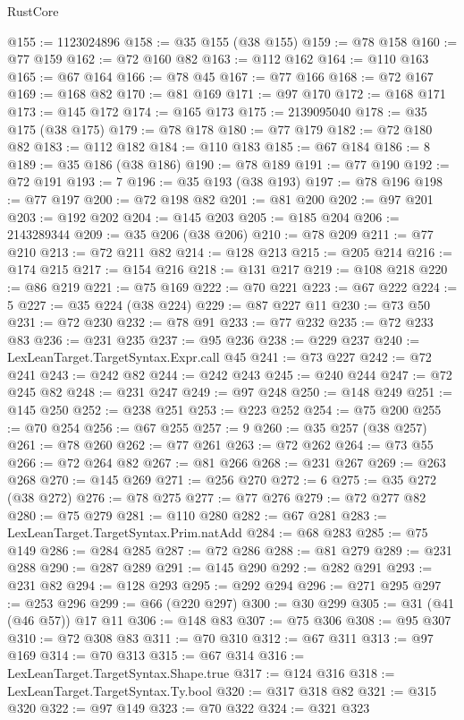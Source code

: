 \begin{lexlean}{RustCore}
\begin{coremodule}
@155 := 1123024896
@158 := @35 @155 (@38 @155)
@159 := @78 @158
@160 := @77 @159
@162 := @72 @160 @82
@163 := @112 @162
@164 := @110 @163
@165 := @67 @164
@166 := @78 @45
@167 := @77 @166
@168 := @72 @167
@169 := @168 @82
@170 := @81 @169
@171 := @97 @170
@172 := @168 @171
@173 := @145 @172
@174 := @165 @173
@175 := 2139095040
@178 := @35 @175 (@38 @175)
@179 := @78 @178
@180 := @77 @179
@182 := @72 @180 @82
@183 := @112 @182
@184 := @110 @183
@185 := @67 @184
@186 := 8
@189 := @35 @186 (@38 @186)
@190 := @78 @189
@191 := @77 @190
@192 := @72 @191
@193 := 7
@196 := @35 @193 (@38 @193)
@197 := @78 @196
@198 := @77 @197
@200 := @72 @198 @82
@201 := @81 @200
@202 := @97 @201
@203 := @192 @202
@204 := @145 @203
@205 := @185 @204
@206 := 2143289344
@209 := @35 @206 (@38 @206)
@210 := @78 @209
@211 := @77 @210
@213 := @72 @211 @82
@214 := @128 @213
@215 := @205 @214
@216 := @174 @215
@217 := @154 @216
@218 := @131 @217
@219 := @108 @218
@220 := @86 @219
@221 := @75 @169
@222 := @70 @221
@223 := @67 @222
@224 := 5
@227 := @35 @224 (@38 @224)
@229 := @87 @227 @11
@230 := @73 @50
@231 := @72 @230
@232 := @78 @91
@233 := @77 @232
@235 := @72 @233 @83
@236 := @231 @235
@237 := @95 @236
@238 := @229 @237
@240 := LexLeanTarget.TargetSyntax.Expr.call @45
@241 := @73 @227
@242 := @72 @241
@243 := @242 @82
@244 := @242 @243
@245 := @240 @244
@247 := @72 @245 @82
@248 := @231 @247
@249 := @97 @248
@250 := @148 @249
@251 := @145 @250
@252 := @238 @251
@253 := @223 @252
@254 := @75 @200
@255 := @70 @254
@256 := @67 @255
@257 := 9
@260 := @35 @257 (@38 @257)
@261 := @78 @260
@262 := @77 @261
@263 := @72 @262
@264 := @73 @55
@266 := @72 @264 @82
@267 := @81 @266
@268 := @231 @267
@269 := @263 @268
@270 := @145 @269
@271 := @256 @270
@272 := 6
@275 := @35 @272 (@38 @272)
@276 := @78 @275
@277 := @77 @276
@279 := @72 @277 @82
@280 := @75 @279
@281 := @110 @280
@282 := @67 @281
@283 := LexLeanTarget.TargetSyntax.Prim.natAdd
@284 := @68 @283
@285 := @75 @149
@286 := @284 @285
@287 := @72 @286
@288 := @81 @279
@289 := @231 @288
@290 := @287 @289
@291 := @145 @290
@292 := @282 @291
@293 := @231 @82
@294 := @128 @293
@295 := @292 @294
@296 := @271 @295
@297 := @253 @296
@299 := @66 (@220 @297)
@300 := @30 @299
@305 := @31 (@41 (@46 @57)) @17 @11
@306 := @148 @83
@307 := @75 @306
@308 := @95 @307
@310 := @72 @308 @83
@311 := @70 @310
@312 := @67 @311
@313 := @97 @169
@314 := @70 @313
@315 := @67 @314
@316 := LexLeanTarget.TargetSyntax.Shape.true
@317 := @124 @316
@318 := LexLeanTarget.TargetSyntax.Ty.bool
@320 := @317 @318 @82
@321 := @315 @320
@322 := @97 @149
@323 := @70 @322
@324 := @321 @323

\end{coremodule}
\end{lexlean}
